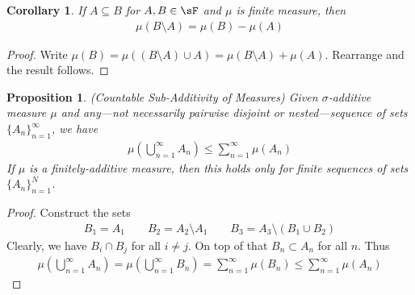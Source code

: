 \documentclass[12pt]{article}
\theoremstyle{plain}
\newtheorem{prop}[thm]{Proposition}
\newtheorem{cor}[thm]{Corollary}
\theoremstyle{definition}
\theoremstyle{remark}
\newcommand{\ninf}{_{n=1}^\infty}
\newcommand{\nN}{_{n=1}^N}
\begin{document}
\clearpage
\begin{cor}
If $A\subseteq B$ for $A,B\in \sF$ and $\mu$ is finite measure, then
\begin{align*}
  \mu(B\setminus A) = \mu(B) - \mu(A)
\end{align*}
\end{cor}
\begin{proof}
Write
$\mu(B) = \mu((B\setminus A) \cup A) = \mu(B\setminus A) + \mu(A)$.
Rearrange and the result follows.
\end{proof}

\begin{prop}\emph{(Countable Sub-Additivity of Measures)}
Given $\sigma$-additive measure $\mu$ and \emph{any}---not necessarily
pairwise disjoint or nested---sequence of sets $\{A_n\}\ninf$, we have
\begin{align*}
  \mu\left(\bigcup^\infty_{n=1} A_n\right)
  \leq \sum\ninf \mu(A_n)
\end{align*}
If $\mu$ is a finitely-additive measure, then this holds only for finite
sequences of sets $\{A_n\}\nN$.
\end{prop}
\begin{proof}
Construct the sets
\begin{align*}
  B_1 = A_1 \qquad B_2 = A_2 \setminus A_1
  \qquad B_3 = A_3 \setminus (B_1 \cup B_2)
\end{align*}
Clearly, we have $B_i \cap B_j$ for all $i\neq j$. On top of that $B_n
\subset A_n$ for all $n$. Thus
\begin{align*}
  \mu\left(\bigcup^\infty_{n=1} A_n\right)
  = \mu\left(\bigcup^\infty_{n=1} B_n\right)
  = \sum\ninf \mu(B_n)
  \leq \sum\ninf \mu(A_n)
\end{align*}
\end{proof}
\end{document}
